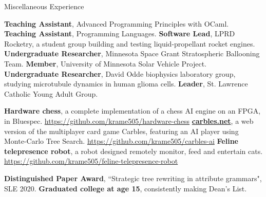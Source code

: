\begin{rubric}{Miscellaneous Experience}

\entry*[2019] \textbf{Teaching Assistant}, Advanced Programming Principles with OCaml.
\entry*[2016] \textbf{Teaching Assistant}, Programming Languages.
\entry*[2016 -- 2020] \textbf{Software Lead}, LPRD Rocketry, a student group building and testing liquid-propellant rocket engines.
\entry*[2013 -- 2015] \textbf{Undergraduate Researcher}, Minnesota Space Grant Stratospheric Ballooning Team.
\entry*[2011 -- 2015] \textbf{Member}, University of Minnesota Solar Vehicle Project.
\entry*[2012] \textbf{Undergraduate Researcher}, David Odde biophysics laboratory group, studying microtubule dynamics in human glioma cells.
\entry*[2022 -- 2023] \textbf{Leader}, St. Lawrence Catholic Young Adult Group.

\entry*[2022] \textbf{Hardware chess}, a complete implementation of a chess AI engine on an FPGA, in Bluespec.
\url{https://github.com/krame505/hardware-chess}
\entry*[2020] \textbf{\href{https://carbles.net}{carbles.net}}, a web version of the multiplayer card game Carbles, featuring an AI player using Monte-Carlo Tree Search.
\url{https://github.com/krame505/carbles-ai}
\entry*[2020] \textbf{Feline telepresence robot}, a robot designed remotely monitor, feed and entertain cats.
\url{https://github.com/krame505/feline-telepresence-robot}


\entry*[2020] \textbf{Distinguished Paper Award}, “Strategic tree rewriting in attribute grammars", SLE 2020.
%
\entry*[2015] \textbf{Graduated college at age 15}, consistently making Dean's List.

\end{rubric}